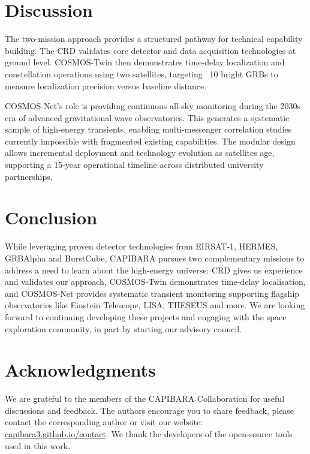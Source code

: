 \documentclass[11pt]{article}
\begin{document}
\section{Discussion}

The two-mission approach provides a structured pathway for technical capability building. The CRD validates core detector and data acquisition technologies at ground level. COSMOS-Twin then demonstrates time-delay localization and constellation operations using two satellites, targeting ~10 bright GRBs to measure localization precision versus baseline distance.

COSMOS-Net's role is providing continuous all-sky monitoring during the 2030s era of advanced gravitational wave observatories. This generates a systematic sample of high-energy transients, enabling multi-messenger correlation studies currently impossible with fragmented existing capabilities. The modular design allows incremental deployment and technology evolution as satellites age, supporting a 15-year operational timeline across distributed university partnerships.

\section{Conclusion}\label{sec:conclusion}

While leveraging proven detector technologies from EIRSAT-1, HERMES, GRBAlpha and BurstCube, CAPIBARA pursues two complementary missions to address a need to learn about the high-energy universe: CRD gives us experience and validates our approach, COSMOS-Twin demonstrates time-delay localisation, and COSMOS-Net provides systematic transient monitoring supporting flagship observatories like Einstein Telescope, LISA, THESEUS and more. We are looking forward to continuing developing these projects and engaging with the space exploration community, in part by starting our advisory council.

\section*{Acknowledgments}

We are grateful to the members of the CAPIBARA Collaboration for useful discussions and feedback. The authors encourage you to share feedback, please contact the corresponding author or visit our website: \href{https://capibara3.github.io/contact}{capibara3.github.io/contact}. We thank the developers of the open-source tools used in this work.

% 


\end{document}
